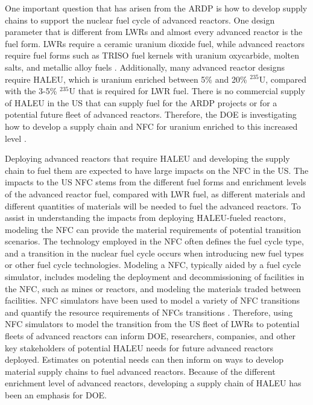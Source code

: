 One important question that has arisen from the \gls{ARDP} is how to
develop supply chains to support the nuclear fuel cycle of 
advanced reactors. One design parameter that is different from \glspl{LWR} 
and almost every advanced reactor is the fuel form. \glspl{LWR} require 
a ceramic uranium dioxide fuel, while advanced reactors require fuel 
forms such as \gls{TRISO} fuel kernels with uranium oxycarbide, molten 
salts, and metallic alloy fuels \cite{hussain_advances_2018}.
Additionally, many advanced reactor designs require  
\acrfull{HALEU}, which is uranium enriched between 5\% and 20\% $^{235}$U,
compared with the 3-5\% $^{235}$U that is required for \gls{LWR} 
fuel. There is no commercial supply of \gls{HALEU} in the US that can 
supply fuel for the \gls{ARDP} projects or for a potential future fleet of 
advanced reactors. Therefore, the \gls{DOE} is investigating how to develop 
a supply chain and \gls{NFC} for uranium enriched to this 
increased level \cite{regalbuto_addressing_2020,dixon_estimated_2022}. 

Deploying advanced reactors that require \gls{HALEU} and developing 
the supply chain to fuel them are expected to have large impacts on 
the \gls{NFC} in the US. The impacts to the US \gls{NFC} stems from the 
different fuel forms and enrichment levels of the advanced reactor fuel, 
compared with \gls{LWR} fuel, as different materials and different 
quantities of materials will be needed to fuel the advanced reactors. 
To assist in understanding the impacts 
from deploying \gls{HALEU}-fueled reactors, modeling the \gls{NFC} 
can provide the material requirements of potential transition scenarios. 
The technology employed in the \gls{NFC} often defines the fuel 
cycle type, and a transition in the nuclear fuel cycle occurs when 
introducing new fuel types or other fuel cycle technologies.  
Modeling  a \gls{NFC}, typically aided by a fuel cycle simulator, 
includes modeling the deployment and decommissioning of facilities in 
the \gls{NFC}, such as mines or reactors, and modeling the materials 
traded between facilities. 
\gls{NFC} simulators have been used to model a variety of \gls{NFC} 
transitions \cite{sunny_transition_2015,bae_fuel_2018,piet_dynamic_2011} 
and quantify the resource requirements of \glspl{NFC} transitions
\cite{bachmann_enrichment_2021}. Therefore, using \gls{NFC} simulators to 
model the transition from the US fleet of \glspl{LWR} to potential 
fleets of advanced reactors can inform \gls{DOE}, researchers, companies, 
and other key stakeholders of potential \gls{HALEU} needs for future 
advanced reactors deployed. Estimates on potential needs can then inform on 
ways to develop material supply chains to fuel advanced reactors. Because of
the different enrichment level of advanced reactors, developing a supply 
chain of \gls{HALEU} has been an emphasis for \gls{DOE}. 


